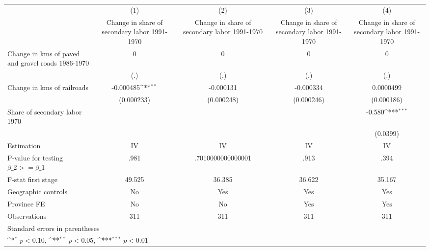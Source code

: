 {
\def\sym#1{\ifmmode^{#1}\else\(^{#1}\)\fi}
\begin{tabular}{l*{4}{c}}
\hline\hline
                    &\multicolumn{1}{c}{(1)}&\multicolumn{1}{c}{(2)}&\multicolumn{1}{c}{(3)}&\multicolumn{1}{c}{(4)}\\
                    &\multicolumn{1}{c}{Change in share of secondary labor 1991-1970}&\multicolumn{1}{c}{Change in share of secondary labor 1991-1970}&\multicolumn{1}{c}{Change in share of secondary labor 1991-1970}&\multicolumn{1}{c}{Change in share of secondary labor 1991-1970}\\
\hline
Change in kms of paved and gravel roads 1986-1970&           0         &           0         &           0         &           0         \\
                    &         (.)         &         (.)         &         (.)         &         (.)         \\
[1em]
Change in kms of railroads&   -0.000485\sym{**} &   -0.000131         &   -0.000334         &   0.0000499         \\
                    &  (0.000233)         &  (0.000248)         &  (0.000246)         &  (0.000186)         \\
[1em]
Share of secondary labor 1970&                     &                     &                     &      -0.580\sym{***}\\
                    &                     &                     &                     &    (0.0399)         \\
\hline
Estimation          &          IV         &          IV         &          IV         &          IV         \\
P-value for testing $\beta\_2 >= \beta\_1$&        .981         &.7010000000000001         &        .913         &        .394         \\
F-stat first stage  &      49.525         &      36.385         &      36.622         &      35.167         \\
Geographic controls &          No         &         Yes         &         Yes         &         Yes         \\
Province FE         &          No         &          No         &         Yes         &         Yes         \\
Observations        &         311         &         311         &         311         &         311         \\
\hline\hline
\multicolumn{5}{l}{\footnotesize Standard errors in parentheses}\\
\multicolumn{5}{l}{\footnotesize \sym{*} \(p<0.10\), \sym{**} \(p<0.05\), \sym{***} \(p<0.01\)}\\
\end{tabular}
}
